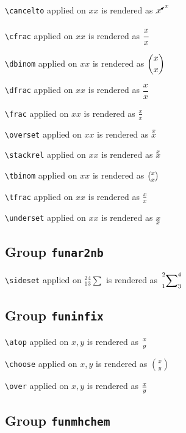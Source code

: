 \texttt{\textbackslash cancelto} applied on ${x}{x}$ is rendered as $\cancelto{x}{x}$

\texttt{\textbackslash cfrac} applied on ${x}{x}$ is rendered as $\cfrac{x}{x}$

\texttt{\textbackslash dbinom} applied on ${x}{x}$ is rendered as $\dbinom{x}{x}$

\texttt{\textbackslash dfrac} applied on ${x}{x}$ is rendered as $\dfrac{x}{x}$

\texttt{\textbackslash frac} applied on ${x}{x}$ is rendered as $\frac{x}{x}$





\texttt{\textbackslash overset} applied on ${x}{x}$ is rendered as $\overset{x}{x}$



\texttt{\textbackslash stackrel} applied on ${x}{x}$ is rendered as $\stackrel{x}{x}$

\texttt{\textbackslash tbinom} applied on ${x}{x}$ is rendered as $\tbinom{x}{x}$

\texttt{\textbackslash tfrac} applied on ${x}{x}$ is rendered as $\tfrac{x}{x}$

\texttt{\textbackslash underset} applied on ${x}{x}$ is rendered as $\underset{x}{x}$

\subsection{ Group \texttt{fun\textunderscore ar2nb}}

\texttt{\textbackslash sideset} applied on ${_1^2}{_3^4}\sum$ is rendered as $\sideset{_1^2}{_3^4}\sum$

\subsection{ Group \texttt{fun\textunderscore infix}}

\texttt{\textbackslash atop} applied on $ x, y$ is rendered as $x\atop y$

\texttt{\textbackslash choose} applied on $ x, y$ is rendered as $x\choose y$

\texttt{\textbackslash over} applied on $ x, y$ is rendered as $x\over y$

\subsection{ Group \texttt{fun\textunderscore mhchem}}

